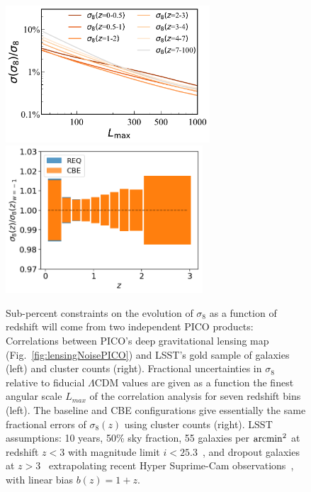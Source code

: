 \documentclass[PICOReport.tex]{subfiles}
\begin{document}
\begin{figure}
\centering
\hspace{-0.15in}
\includegraphics[width=3in]{images/PICO_s8_lmax_PICOv4.1b_deproj0_SENS0_LSST10yrGold.pdf}
\hspace{-0.1in}
\includegraphics[width=2.9in,trim= 0cm 0.2cm 0cm 0cm]{images/PICOS8.png}
\caption{\captiontext  
Sub-percent constraints on the evolution of $\sigma_{8}$ as a function of redshift will come from two independent PICO products: Correlations between PICO's deep gravitational lensing map (Fig.~\ref{fig:lensingNoisePICO}) and LSST's gold sample of galaxies (left) and cluster counts (right). Fractional uncertainties in $\sigma_{8}$ relative to fiducial $\Lambda$CDM values are given as a function the finest angular scale $L_{max}$ of the correlation analysis for seven redshift bins (left).  The baseline and CBE configurations give essentially the same fractional errors of $\sigma_{8}(z)$ using cluster counts (right).  LSST assumptions: 10 years, 50\% sky fraction, 55 galaxies per ${\rm arcmin}^{2}$ at redshift $z<3$ with magnitude limit $i <25.3$~\citep{LSSTSciBook}, and dropout galaxies at $z>3$~\citep{dropouts} extrapolating recent Hyper Suprime-Cam observations~\cite{Schmittfull/Seljak,HSC1,HSC2}, with linear bias $b(z)=1+z$.
\label{fig:sigma8} }
\end{figure}
\end{document}

